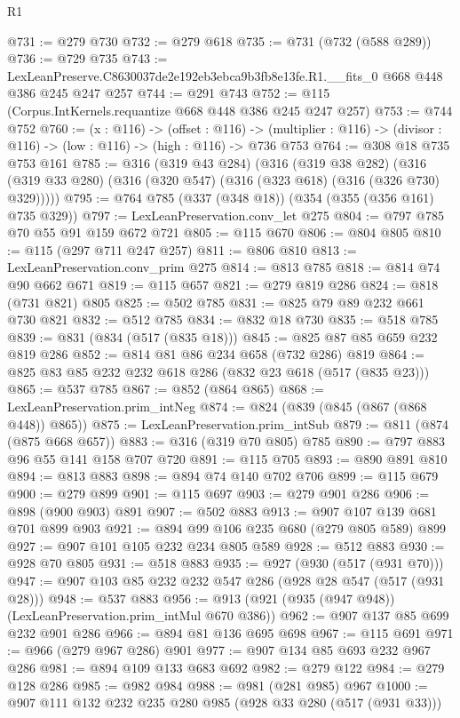 \begin{lexlean}{R1}
\begin{coremodule}
@731 := @279 @730
@732 := @279 @618
@735 := @731 (@732 (@588 @289))
@736 := @729 @735
@743 := LexLeanPreserve.C8630037de2e192eb3ebca9b3fb8e13fe.R1.__fits_0 @668 @448 @386 @245 @247 @257
@744 := @291 @743
@752 := @115 (Corpus.IntKernels.requantize @668 @448 @386 @245 @247 @257)
@753 := @744 @752
@760 := (x : @116) ->
  (offset : @116) ->
  (multiplier : @116) -> (divisor : @116) -> (low : @116) -> (high : @116) -> @736 @753
@764 := @308 @18 @735 @753 @161
@785 := @316
    (@319 @43 @284)
    (@316
      (@319 @38 @282)
      (@316 (@319 @33 @280) (@316 (@320 @547) (@316 (@323 @618) (@316 (@326 @730) @329)))))
@795 := @764 @785 (@337 (@348 @18)) (@354 (@355 (@356 @161) @735 @329))
@797 := LexLeanPreservation.conv_let @275
@804 := @797 @785 @70 @55 @91 @159 @672 @721
@805 := @115 @670
@806 := @804 @805
@810 := @115 (@297 @711 @247 @257)
@811 := @806 @810
@813 := LexLeanPreservation.conv_prim @275
@814 := @813 @785
@818 := @814 @74 @90 @662 @671
@819 := @115 @657
@821 := @279 @819 @286
@824 := @818 (@731 @821) @805
@825 := @502 @785
@831 := @825 @79 @89 @232 @661 @730 @821
@832 := @512 @785
@834 := @832 @18 @730
@835 := @518 @785
@839 := @831 (@834 (@517 (@835 @18)))
@845 := @825 @87 @85 @659 @232 @819 @286
@852 := @814 @81 @86 @234 @658 (@732 @286) @819
@864 := @825 @83 @85 @232 @232 @618 @286 (@832 @23 @618 (@517 (@835 @23)))
@865 := @537 @785
@867 := @852 (@864 @865)
@868 := LexLeanPreservation.prim_intNeg
@874 := @824 (@839 (@845 (@867 (@868 @448)) @865))
@875 := LexLeanPreservation.prim_intSub
@879 := @811 (@874 (@875 @668 @657))
@883 := @316 (@319 @70 @805) @785
@890 := @797 @883 @96 @55 @141 @158 @707 @720
@891 := @115 @705
@893 := @890 @891 @810
@894 := @813 @883
@898 := @894 @74 @140 @702 @706
@899 := @115 @679
@900 := @279 @899
@901 := @115 @697
@903 := @279 @901 @286
@906 := @898 (@900 @903) @891
@907 := @502 @883
@913 := @907 @107 @139 @681 @701 @899 @903
@921 := @894 @99 @106 @235 @680 (@279 @805 @589) @899
@927 := @907 @101 @105 @232 @234 @805 @589
@928 := @512 @883
@930 := @928 @70 @805
@931 := @518 @883
@935 := @927 (@930 (@517 (@931 @70)))
@947 := @907 @103 @85 @232 @232 @547 @286 (@928 @28 @547 (@517 (@931 @28)))
@948 := @537 @883
@956 := @913 (@921 (@935 (@947 @948)) (LexLeanPreservation.prim_intMul @670 @386))
@962 := @907 @137 @85 @699 @232 @901 @286
@966 := @894 @81 @136 @695 @698
@967 := @115 @691
@971 := @966 (@279 @967 @286) @901
@977 := @907 @134 @85 @693 @232 @967 @286
@981 := @894 @109 @133 @683 @692
@982 := @279 @122
@984 := @279 @128 @286
@985 := @982 @984
@988 := @981 (@281 @985) @967
@1000 := @907 @111 @132 @232 @235 @280 @985 (@928 @33 @280 (@517 (@931 @33)))

\end{coremodule}
\end{lexlean}
